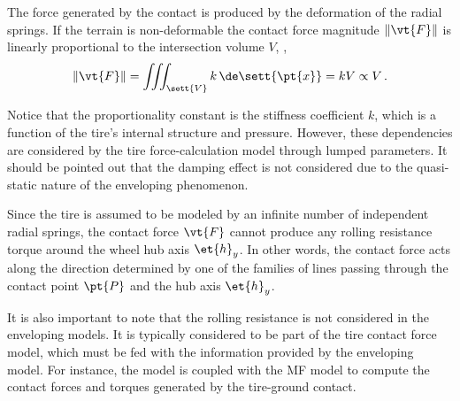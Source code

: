 \begin{observation}
  The force generated by the contact is produced by the deformation of the radial springs. If the terrain is non-deformable the contact force magnitude $\|\vt{F}\|$ is linearly proportional to the intersection volume $V$, \ie{},
  \begin{equation*}
    \| \vt{F} \| = \iiint_\sett{V} k \, \de\sett{\pt{x}} = k V \propto V \, \text{.}
  \end{equation*}
\end{observation}
%
Notice that the proportionality constant is the stiffness coefficient $k$, which is a function of the tire's internal structure and pressure. However, these dependencies are considered by the tire force-calculation model through lumped parameters. It should be pointed out that the damping effect is not considered due to the quasi-static nature of the enveloping phenomenon.
%
\begin{observation}
  Since the tire is assumed to be modeled by an infinite number of independent radial springs, the contact force $\vt{F}$ cannot produce any rolling resistance torque around the wheel hub axis $\et{h}_y$. In other words, the contact force acts along the direction determined by one of the families of lines passing through the contact point $\pt{P}$ and the hub axis $\et{h}_y$.
\end{observation}
%
It is also important to note that the rolling resistance is not considered in the enveloping models. It is typically considered to be part of the tire contact force model, which must be fed with the information provided by the enveloping model. For instance, the \Swift{} model is coupled with the \ac{MF} model to compute the contact forces and torques generated by the tire-ground contact.

